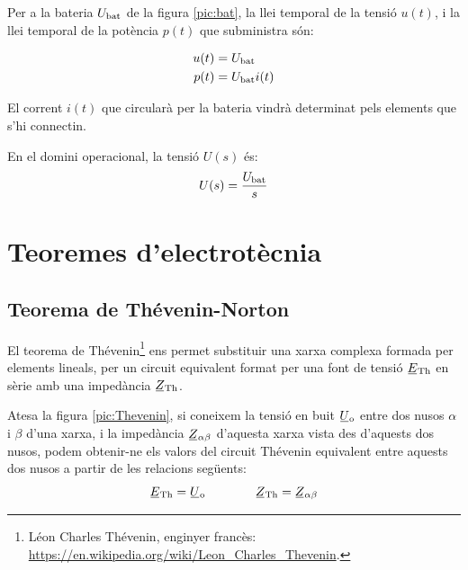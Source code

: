 Per a la bateria $U_\mathrm{bat}$ de la figura
\vref{pic:bat}, la llei temporal de la tensió $u(t)$, i la llei temporal de la
potència $p(t)$ que subministra són:

\hfill
\begin{minipage}[b]{5cm}
	
	\label{pic:bat}
\end{minipage}
\hfill
\begin{minipage}[b][3cm][t]{8cm}
	\begin{align}
		u(t) &= U_\mathrm{bat} \\  p(t) &= U_\mathrm{bat} i(t)
	\end{align}
\end{minipage}


El corrent $i(t)$ que circularà per la bateria vindrà determinat
pels elements que s'hi connectin.

 En el domini operacional, la
tensió $U(s)$ és:
\begin{equation}
	U(s) = \frac{U_\mathrm{bat}}{s}
\end{equation}



\section{Teoremes d'electrotècnia}\label{sec:teoremes}

\subsection{\texorpdfstring{Teorema de Thévenin-Norton}{Teorema de
            Thévenin-Norton}}\label{sec:T_N}

El teorema de Thévenin\footnote{Léon Charles Thévenin, enginyer francès:  \href{https://en.wikipedia.org/wiki/Leon_Charles_Thevenin}{https:/\!\!/en.wikipedia.org/wiki/Leon\_Charles\_Thevenin}.} ens permet
substituir una xarxa complexa formada per elements lineals, per un
circuit equivalent format per una font de tensió $\cmplx{E}\ped{Th}$
en sèrie amb una impedància $\cmplx{Z}\ped{Th}$.


Atesa la figura \vref{pic:Thevenin}, si coneixem la tensió en
buit $\cmplx{U}\ped{o}$ entre dos nusos $\alpha$ i $\beta$ d'una
xarxa, i la impedància $\cmplx{Z}_{\alpha\beta}$ d'aquesta xarxa
vista des d'aquests dos nusos, podem obtenir-ne els valors del circuit
Thévenin equivalent entre aquests dos nusos a partir de les
relacions següents:
\begin{equation}
   \cmplx{E}\ped{Th} = \cmplx{U}\ped{o} \qquad\qquad  \cmplx{Z}\ped{Th} = \cmplx{Z}_{\alpha\beta}
\end{equation}

